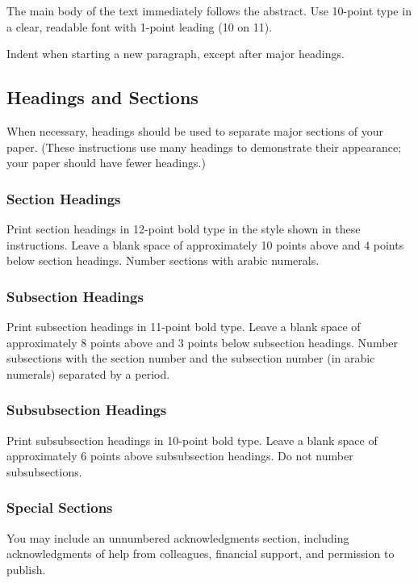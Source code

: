 \documentclass{article}
\theoremstyle{definition}
\begin{document}
The main body of the text immediately follows the abstract. Use
10-point type in a clear, readable font with 1-point leading (10 on
11).

Indent when starting a new paragraph, except after major headings.

\subsection{Headings and Sections}

When necessary, headings should be used to separate major sections of
your paper. (These instructions use many headings to demonstrate their
appearance; your paper should have fewer headings.)

\subsubsection{Section Headings}

Print section headings in 12-point bold type in the style shown in
these instructions. Leave a blank space of approximately 10 points
above and 4 points below section headings.  Number sections with
arabic numerals.

\subsubsection{Subsection Headings}

Print subsection headings in 11-point bold type. Leave a blank space
of approximately 8 points above and 3 points below subsection
headings. Number subsections with the section number and the
subsection number (in arabic numerals) separated by a
period.

\subsubsection{Subsubsection Headings}

Print subsubsection headings in 10-point bold type. Leave a blank
space of approximately 6 points above subsubsection headings. Do not
number subsubsections.

\subsubsection{Special Sections}

You may include an unnumbered acknowledgments section, including
acknowledgments of help from colleagues, financial support, and
permission to publish.
\end{document}
